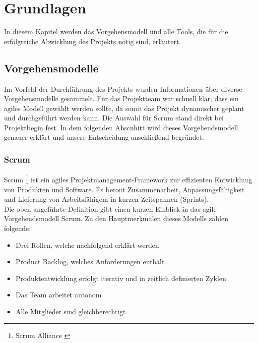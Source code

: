 \chapter{Grundlagen}
In diesem Kapitel werden das Vorgehensmodell und alle Tools, die für die erfolgreiche
Abwicklung des Projekts nötig sind, erläutert.

\section{Vorgehensmodelle}
Im Vorfeld der Durchführung des Projekts wurden Informationen über diverse Vorgehensmodelle
gesammelt. Für das Projektteam war schnell klar, dass ein agiles Modell gewählt werden sollte,
da somit das Projekt dynamischer geplant und durchgeführt werden kann. Die Auswahl für Scrum
stand direkt bei Projektbegin fest. In dem folgenden Abscnhitt wird dieses
Vorgehendsmodell genauer erklärt und unsere Entscheidung anschließend begründet.

\subsection{Scrum}
Scrum \footnote{Scrum Alliance \cite{WHAT-IS-SCRUM}} ist ein agiles Projektmanagement-Framework zur effizienten Entwicklung von Produkten und Software.
Es betont Zusammenarbeit, Anpassungsfähigkeit und Lieferung von Arbeitsfähigem in kurzen Zeitspannen (Sprints). \\

\noindent Die oben angeführte Definition gibt einen kurzen Einblick in das agile Vorgehendsmodell
Scrum. Zu den Hauptmerkmalen dieses Modells zählen folgende:
\begin{itemize}
    \item Drei Rollen, welche nachfolgend erklärt werden
    \item Product Backlog, welches Anforderungen enthält
    \item Produktentwicklung erfolgt iterativ und in zeitlich definierten Zyklen
    \item Das Team arbeitet autonom
    \item Alle Mitglieder sind gleichberechtigt\\
\end{itemize}

